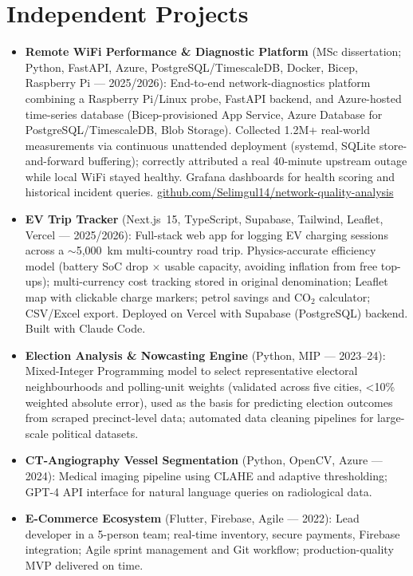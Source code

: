 \documentclass[11pt,a4paper,sans]{moderncv}
\begin{document}
\section{Independent Projects}
\vspace{1pt}
\begin{itemize}

\item \textbf{Remote WiFi Performance \& Diagnostic Platform} (MSc dissertation; Python, FastAPI, Azure, PostgreSQL/TimescaleDB, Docker, Bicep, Raspberry Pi --- 2025/2026): End-to-end network-diagnostics platform combining a Raspberry Pi/Linux probe, FastAPI backend, and Azure-hosted time-series database (Bicep-provisioned App Service, Azure Database for PostgreSQL/TimescaleDB, Blob Storage). Collected 1.2M+ real-world measurements via continuous unattended deployment (systemd, SQLite store-and-forward buffering); correctly attributed a real 40-minute upstream outage while local WiFi stayed healthy. Grafana dashboards for health scoring and historical incident queries. \href{https://github.com/Selimgul14/network-quality-analysis}{github.com/Selimgul14/network-quality-analysis}

\item \textbf{EV Trip Tracker} (Next.js~15, TypeScript, Supabase, Tailwind, Leaflet, Vercel --- 2025/2026): Full-stack web app for logging EV charging sessions across a $\sim$5{,}000~km multi-country road trip. Physics-accurate efficiency model (battery SoC drop $\times$ usable capacity, avoiding inflation from free top-ups); multi-currency cost tracking stored in original denomination; Leaflet map with clickable charge markers; petrol savings and CO$_{2}$ calculator; CSV/Excel export. Deployed on Vercel with Supabase (PostgreSQL) backend. Built with Claude Code.

\item \textbf{Election Analysis \& Nowcasting Engine} (Python, MIP --- 2023--24): Mixed-Integer Programming model to select representative electoral neighbourhoods and polling-unit weights (validated across five cities, <10\% weighted absolute error), used as the basis for predicting election outcomes from scraped precinct-level data; automated data cleaning pipelines for large-scale political datasets.

\item \textbf{CT-Angiography Vessel Segmentation} (Python, OpenCV, Azure --- 2024): Medical imaging pipeline using CLAHE and adaptive thresholding; GPT-4 API interface for natural language queries on radiological data.

\item \textbf{E-Commerce Ecosystem} (Flutter, Firebase, Agile --- 2022): Lead developer in a 5-person team; real-time inventory, secure payments, Firebase integration; Agile sprint management and Git workflow; production-quality MVP delivered on time.

\end{itemize}
\end{document}
